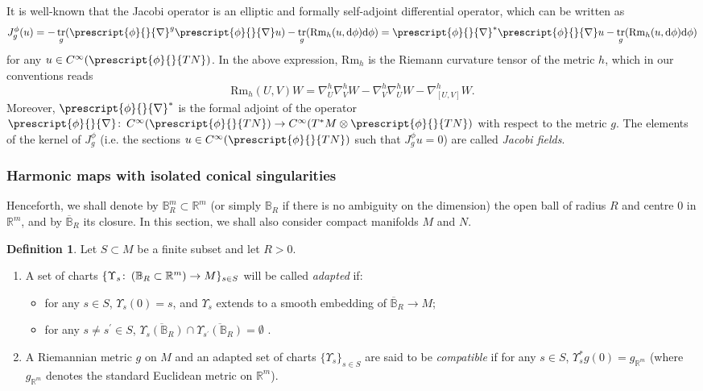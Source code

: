 \documentclass{article}
\numberwithin{equation}{section}        %
\theoremstyle{bfnote}
\theoremstyle{definition}
\newtheorem{Def}[thm]{Definition}           %
\theoremstyle{bfremark}
\newcommand{\col}{\colon \thinspace}        %
\newcommand{\R}{\mathbb{R}}                 %
\newcommand{\Ball}{\mathbb{B}}              %
\newcommand{\diff}{\mathrm{d}}                      %
\DeclareMathOperator{\tr}{tr}                   %
\begin{document}
It is well-known that the Jacobi operator is an elliptic and formally self-adjoint differential operator, which can be written as
\begin{equation}        \label{eq: Jacobi operator in general}
    J^\phi_{g}(u) = - \tr_{g}(\prescript{\phi}{}{\nabla}^{g} \prescript{\phi}{}{\nabla} u) - \tr_{g}(\mathrm{Rm}_h(u, \diff\phi) \diff\phi) = \prescript{\phi}{}{\nabla}^*\prescript{\phi}{}{\nabla} u - \tr_{g}(\mathrm{Rm}_h(u, \diff\phi) \diff\phi)
\end{equation}
for any $u \in C^\infty(\prescript{\phi}{}{TN})$. In the above expression, $\mathrm{Rm}_h$ is the Riemann curvature tensor of the metric $h$, which in our conventions reads
\begin{equation*}
    \mathrm{Rm}_h(U,V)W  = \nabla^h_U \nabla^h_V W - \nabla^h_V \nabla^h_U W - \nabla^h_{[U,V]} W .
\end{equation*} 
Moreover, $\prescript{\phi}{}{\nabla}^*$ is the formal adjoint of the operator $\prescript{\phi}{}{\nabla} \col C^\infty(\prescript{\phi}{}{TN}) \rightarrow C^\infty(T^*M \otimes \prescript{\phi}{}{TN})$ with respect to the metric $g$. The elements of the kernel of $J^\phi_g$ (i.e. the sections $u \in C^\infty(\prescript{\phi}{}{TN})$ such that $J^\phi_g u = 0$) are called \emph{Jacobi fields}.


    \subsubsection{Harmonic maps with isolated conical singularities}       \label{subsubsec: cs harmonic maps}

Henceforth, we shall denote by $\Ball^m_R \subset \R^m$ (or simply $\Ball_R$ if there is no ambiguity on the dimension) the open ball of radius $R$ and centre $0$ in $\R^m$, and by $\overline{\Ball}_R$ its closure. In this section, we shall also consider compact manifolds $M$ and $N$.

\begin{Def}     \label{Def: Adapted set of charts}
    Let $S \subset M$ be a finite subset and let $R > 0$. 
    \begin{enumerate}
        \item A set of charts $\{ \Upsilon_s \col (\Ball_R \subset \R^m) \to M\}_{s \in S}$ will be called \emph{adapted} if:
        \begin{itemize}
            \item for any $s \in S$, $\Upsilon_s(0) = s$, and $\Upsilon_s$ extends to a smooth embedding of $\overline{\Ball}_R \to M$;
            \item for any $s \neq s^\prime \in S$, $\overline{\Upsilon_s(\Ball_R)} \cap \overline{\Upsilon_{s^\prime}(\Ball_R)} = \emptyset$ .
        \end{itemize}

        \item A Riemannian metric $g$ on $M$ and an adapted set of charts $\{ \Upsilon_s \}_{s \in S}$ are said to be \emph{compatible} if for any $s \in S$, $\Upsilon^*_s g(0) = g_{\R^m}$ (where $g_{\R^m}$ denotes the standard Euclidean metric on $\R^m$).
    \end{enumerate}
\end{Def}
\end{document}
